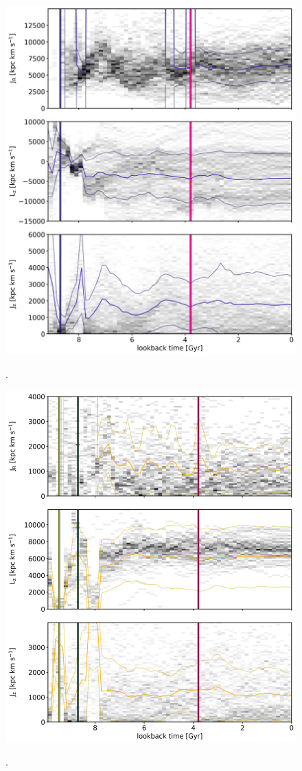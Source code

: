 \begin{figure}
    \centering
	\includegraphics[width=\textwidth]{plots/Dynamics/prog3/action_time_evolution_hist_mean.png}
    \label{fig:time_ev_box_GCs}
    \caption{.}\label{fig:actions_time_evolution}
\end{figure}
\begin{figure}
    \centering
	\includegraphics[width=\textwidth]{plots/Dynamics/prog4/action_time_evolution_hist_mean.png}
    \label{fig:time_ev_box_GCs}
    \caption{.}\label{fig:actions_time_evolution}
\end{figure}
